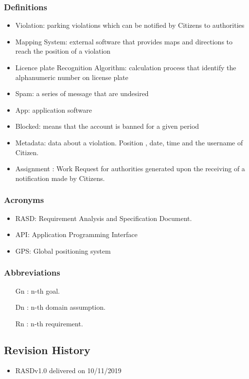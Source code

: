 \subsubsection {Definitions}
\begin{itemize}
\item	Violation: parking violations which can be notified by Citizens to authorities
\item	Mapping System: external software that provides maps and directions to reach the position of a violation
\item	Licence plate Recognition Algorithm: calculation process that identify the alphanumeric number on license plate
\item	Spam: a series of message that are undesired
\item	App: application software 
\item	Blocked: means that the account is banned for a given period
\item	Metadata: data about a violation. Position , date,  time and the username of Citizen. 
\item	Assignment : Work Request for authorities generated upon the receiving of a notification made by Citizens.
\end{itemize}
\subsubsection {Acronyms}
\begin{itemize}
\item	RASD: Requirement Analysis and Specification Document.
\item	API: Application Programming Interface
\item	GPS: Global positioning system

\end{itemize}
\subsubsection {Abbreviations}
\begin{itemize}
\item	[Gn]: n-th goal.
\item	[Dn]: n-th domain assumption.
\item	[Rn]: n-th requirement.
\end{itemize}
\subsection {Revision History}
\begin{itemize}
\item	RASDv1.0 delivered on 10/11/2019
\end{itemize}
